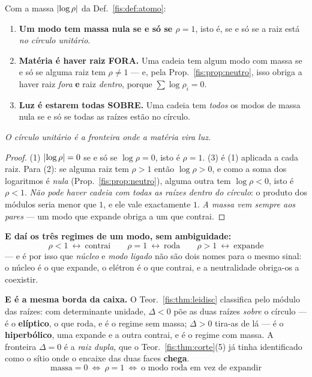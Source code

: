 \documentclass[livro.tex]{subfiles}
\begin{document}
\begin{teorema}\label{fis:thm:massa}
Com a massa $\lvert \log\rho\rvert$ da Def.~\ref{fis:def:atomo}:
\begin{enumerate}\itemsep3pt
\item[(1)] \textbf{Um modo tem massa nula se e só se $\rho=1$}, isto é, se e só se
a raiz está \emph{no círculo unitário}.
\item[(2)] \textbf{Matéria é haver raiz FORA.} Uma cadeia tem algum modo com
massa se e só se alguma raiz tem $\rho\neq1$ --- e, pela
Prop.~\ref{fis:prop:neutro}, isso obriga a haver raiz \emph{fora} \textbf{e}
raiz \emph{dentro}, porque $\sum\log\rho_i=0$.
\item[(3)] \textbf{Luz é estarem todas SOBRE.} Uma cadeia tem \emph{todos} os
modos de massa nula se e só se todas as raízes estão no círculo.
\end{enumerate}
\emph{O círculo unitário é a fronteira onde a matéria vira luz.}
\end{teorema}

\begin{proof}
(1) $\lvert \log\rho\rvert=0$ se e só se $\log\rho=0$, isto é $\rho=1$. (3) é (1)
aplicada a cada raiz. Para (2): se alguma raiz tem $\rho>1$ então
$\log\rho>0$, e como a soma dos logaritmos é \emph{nula}
(Prop.~\ref{fis:prop:neutro}), alguma outra tem $\log\rho<0$, isto é $\rho<1$.
\emph{Não pode haver cadeia com todas as raízes dentro do círculo}: o produto dos
módulos seria menor que $1$, e ele vale exactamente $1$. \emph{A massa vem
sempre aos pares} --- um modo que expande obriga a um que contrai.
\end{proof}

\medskip\noindent\textbf{E daí os três regimes de um modo, sem ambiguidade:}
\[
\boxed{\;
\rho<1\ \longleftrightarrow\ \text{contrai}
\qquad
\rho=1\ \longleftrightarrow\ \text{roda}
\qquad
\rho>1\ \longleftrightarrow\ \text{expande}
\;}
\]
--- e é por isso que \emph{núcleo} e \emph{modo ligado} não são dois nomes para o
mesmo sinal: o núcleo é o que expande, o elétron é o que contrai, e a
neutralidade obriga-os a coexistir.

\medskip\noindent\textbf{E é a mesma borda da caixa.} O
Teor.~\ref{fis:thm:leidisc} classifica pelo módulo das raízes: com determinante
unidade, $\Delta<0$ põe as duas raízes \emph{sobre} o círculo --- é o
\textbf{elíptico}, o que roda, e é o regime sem massa; $\Delta>0$ tira-as de lá
--- é o \textbf{hiperbólico}, uma expande e a outra contrai, e é o regime com
massa. A fronteira $\Delta=0$ é a \emph{raiz dupla}, que o
Teor.~\ref{fis:thm:corte}(5) já tinha identificado como o sítio onde o encaixe das duas faces \textbf{chega}.
\[
\boxed{\;\text{massa}=0\ \iff\ \rho=1\ \iff\ \text{o modo roda em vez de expandir}\;}
\]
\end{document}
